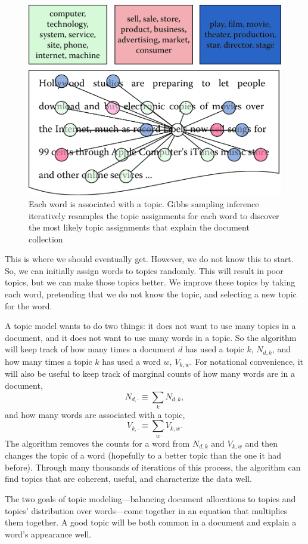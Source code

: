 \documentclass[]{krantz}
\begin{document}
\begin{figure}

{\centering \includegraphics[width=0.7\linewidth]{ChapterText/figures/inference_1} 

}

\caption{Each word is associated with a topic. Gibbs sampling inference iteratively resamples the topic assignments for each word to discover the most likely topic assignments that explain the document collection}\label{fig:inference-1}
\end{figure}

This is where we should eventually get. However, we do not know this to
start. So, we can initially assign words to topics randomly. This will
result in poor topics, but we can make those topics better. We improve
these topics by taking each word, pretending that we do not know the
topic, and selecting a new topic for the word.

A topic model wants to do two things: it does not want to use many
topics in a document, and it does not want to use many words in a topic.
So the algorithm will keep track of how many times a document \(d\) has
used a topic \(k\), \(N_{d,k}\), and how many times a topic \(k\) has
used a word \(w\), \(V_{k,w}\). For notational convenience, it will also
be useful to keep track of marginal counts of how many words are in a
document, \[N_{d, \cdot} \equiv \sum_k N_{d,k},\] and how many words are
associated with a topic, \[V_{k, \cdot} \equiv \sum_w V_{k, w}.\] The
algorithm removes the counts for a word from \(N_{d,k}\) and \(V_{k,w}\)
and then changes the topic of a word (hopefully to a better topic than
the one it had before). Through many thousands of iterations of this
process, the algorithm can find topics that are coherent, useful, and
characterize the data well.

The two goals of topic modeling---balancing document allocations to
topics and topics' distribution over words---come together in an
equation that multiplies them together. A good topic will be both common
in a document and explain a word's appearance well.
\end{document}
